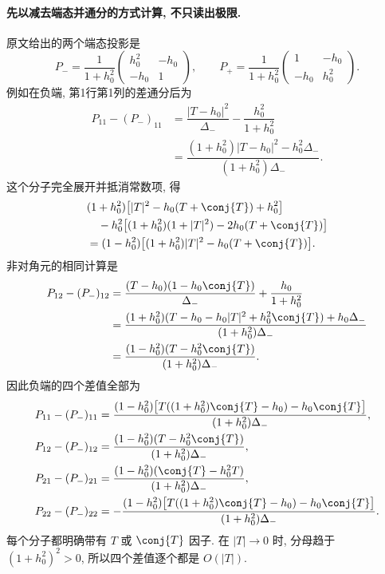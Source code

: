 \paragraph{先以减去端态并通分的方式计算, 不只读出极限.}
原文给出的两个端态投影是
\[
P_- =\dfrac{1}{1+h_0^2}
\begin{pmatrix}h_0^2&-h_0\\-h_0&1\end{pmatrix},
\qquad
P_+ =\dfrac{1}{1+h_0^2}
\begin{pmatrix}1&-h_0\\-h_0&h_0^2\end{pmatrix}.
\]
例如在负端, 第1行第1列的差通分后为
\begin{align*}
P_{11}-(P_-)_{11}
&=\dfrac{|T-h_0|^2}{\Delta_-}-\dfrac{h_0^2}{1+h_0^2}\\
&=\dfrac{(1+h_0^2)|T-h_0|^2-h_0^2\Delta_-}
{(1+h_0^2)\Delta_-}.
\end{align*}
这个分子完全展开并抵消常数项, 得
\begin{align*}
&(1+h_0^2)\bigl[|T|^2-h_0(T+\conj{T})+h_0^2\bigr]\\
&\quad-h_0^2\bigl[(1+h_0^2)(1+|T|^2)-2h_0(T+\conj{T})\bigr]\\
&=(1-h_0^2)\bigl[(1+h_0^2)|T|^2-h_0(T+\conj{T})\bigr].
\end{align*}
非对角元的相同计算是
\begin{align*}
P_{12}-(P_-)_{12}
&=\dfrac{(T-h_0)(1-h_0\conj{T})}{\Delta_-}
+\dfrac{h_0}{1+h_0^2}\\
&=\dfrac{(1+h_0^2)(T-h_0-h_0|T|^2+h_0^2\conj{T})
+h_0\Delta_-}{(1+h_0^2)\Delta_-}\\
&=\dfrac{(1-h_0^2)(T-h_0^2\conj{T})}
{(1+h_0^2)\Delta_-}.
\end{align*}
因此负端的四个差值全部为
\begin{align*}
P_{11}-(P_-)_{11}
&=\dfrac{(1-h_0^2)
\bigl[T((1+h_0^2)\conj{T}-h_0)-h_0\conj{T}\bigr]}
{(1+h_0^2)\Delta_-},\\
P_{12}-(P_-)_{12}
&=\dfrac{(1-h_0^2)(T-h_0^2\conj{T})}
{(1+h_0^2)\Delta_-},\\
P_{21}-(P_-)_{21}
&=\dfrac{(1-h_0^2)(\conj{T}-h_0^2T)}
{(1+h_0^2)\Delta_-},\\
P_{22}-(P_-)_{22}
&=-\dfrac{(1-h_0^2)
\bigl[T((1+h_0^2)\conj{T}-h_0)-h_0\conj{T}\bigr]}
{(1+h_0^2)\Delta_-}.
\end{align*}
每个分子都明确带有 $T$ 或 $\conj{T}$ 因子. 在 $|T|\to0$ 时, 分母趋于 $(1+h_0^2)^2>0$, 所以四个差值逐个都是 $O(|T|)$.


